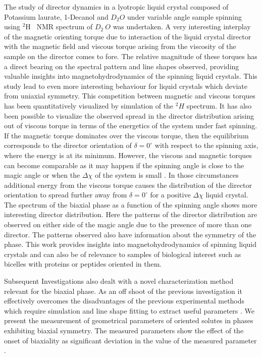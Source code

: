 The study of director dynamics in a lyotropic liquid crystal composed of
Potassium laurate, 1-Decanol and $D_2 O $ \cite{chap31-key6} under variable angle sample spinning
using ${}^2$H~ NMR spectrum of $D_2~ O$ was undertaken. A very interesting interplay of
the magnetic orienting torque due to interaction of the liquid crystal director with
the magnetic field and viscous torque arising from the viscosity of the sample on
the director comes to fore. The relative magnitude of these torques has a direct
bearing on the spectral pattern and line shapes observed, providing valuable
insights into magnetohydrodynamics of the spinning liquid crystals. This study
lead to even more interesting behaviour for liquid crystals which deviate from
uniaxial symmetry. This competition between magnetic and viscous torques has
been quantitatively visualized by simulation of the ${}^2H$ spectrum. It has also been
possible to visualize the observed spread in the director distribution arising out of
viscous torque in terms of the energetics of the system under fast spinning. If the
magnetic torque dominates over the viscous torque, then the equilibrium
corresponds to the director orientation of $\delta = 0^\circ$ with respect to the spinning axis,
where the energy is at its minimum. However, the viscous and magnetic torques
can become comparable as it may happen if the spinning angle is close to the
magic angle or when the $\Delta \chi$ of the system is small \cite{chap31-key7}. In those circumstances
additional energy from the viscous torque causes the distribution of the director
orientation to spread further away from $\delta = 0^{\circ}$ for a positive $\Delta\chi$ liquid crystal.
The spectrum of the biaxial phase \cite{chap31-key8} as a function of the spinning angle shows
more interesting director distribution. Here the patterns of the director distribution
are observed on either side of the magic angle due to the presence of more than
one director. The patterns observed also have information about the symmetry of
the phase. This work provides insights into magnetohydrodynamics of spinning
liquid crystals and can also be of relevance to samples of biological interest such
as bicelles with proteins or peptides oriented in them. \cite{chap31-key9}

Subsequent Investigations also dealt with a novel characterization method
relevant for the biaxial phase. As an off shoot of the previous investigation it
effectively overcomes the disadvantages of the previous experimental methods
which require simulation and line shape fitting to extract useful parameters \cite{chap31-key10}.
We present the measurement of geometrical parameters of oriented solutes in
phases exhibiting biaxial symmetry. The measured parameters show the effect of
the onset of biaxiality as significant deviation in the value of the measured
parameter \cite{chap31-key11}.

